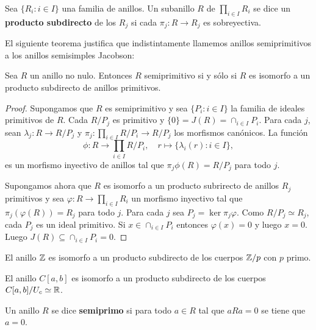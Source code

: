 \begin{definition}
	Sea $\{R_i:i\in I\}$ una familia de anillos. Un subanillo $R$ de
	$\prod_{i\in I}R_i$ se dice un \textbf{producto subdirecto} de los $R_j$ si
	cada $\pi_j\colon R\to R_j$ es sobreyectiva. 
\end{definition}

El siguiente teorema justifica que indistintamente llamemos anillos
semiprimitivos a los anillos semisimples Jacobson:

\begin{theorem}
	\label{thm:subdirecto}
	Sea $R$ un anillo no nulo. Entonces $R$ semiprimitivo si y sólo si $R$ es
	isomorfo a un producto subdirecto de anillos primitivos.
\end{theorem}

\begin{proof}
	Supongamos que $R$ es semiprimitivo y sea $\{P_i:i\in I\}$ la familia de
	ideales primitivos de $R$. Cada $R/P_j$ es primitivo y
	$\{0\}=J(R)=\cap_{i\in I}P_i$. Para cada $j$, sean $\lambda_j\colon R\to
	R/P_j$ y $\pi_j\colon \prod_{i\in I}R/P_i\to R/P_j$ los morfismos
	canónicos. La función
	\[
		\phi\colon R\to\prod_{i\in I}R/P_i,\quad
		r\mapsto \{\lambda_i(r):i\in I\},
	\]
	es un morfismo inyectivo de anillos tal que $\pi_j\phi(R)=R/P_j$ para todo
	$j$.

	Supongamos ahora que $R$ es isomorfo a un producto subrirecto de anillos
	$R_j$ primitivos y sea $\varphi\colon R\to\prod_{i\in I}R_i$ un morfismo
	inyectivo tal que $\pi_j(\varphi(R))=R_j$ para todo $j$. Para cada $j$ sea
	$P_j=\ker\pi_j\varphi$. Como $R/P_j\simeq R_j$, cada $P_j$ es un ideal
	primitivo. Si $x\in\cap_{i\in I}P_i$ entonces $\varphi(x)=0$ y luego $x=0$.
	Luego $J(R)\subseteq\cap_{i\in I} P_i=0$. 
\end{proof}

\begin{example}
	El anillo $\mathbb{Z}$ es isomorfo a un producto subdirecto de los cuerpos $\mathbb{Z}/p$
	con $p$ primo.
\end{example}

\begin{example}
	El anillo $C[a,b]$ es isomorfo a un producto subdirecto de los cuerpos
	$C[a,b]/U_c\simeq\mathbb{R}$.
\end{example}

\begin{definition}
	Un anillo $R$ se dice \textbf{semiprimo} si para todo $a\in R$ tal que
	$aRa=0$ se tiene que $a=0$.
\end{definition}

